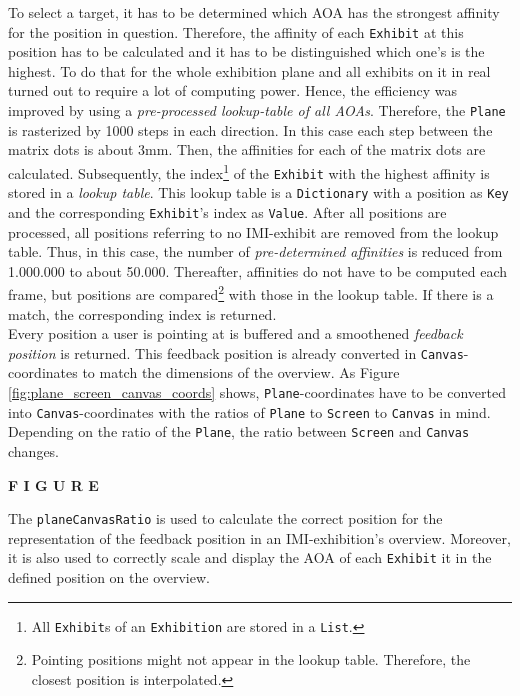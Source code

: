 To select a target, it has to be determined which \ac{AOA} has the strongest affinity for the position in question. Therefore, the affinity of each \texttt{Exhibit} at this position has to be calculated and it has to be distinguished which one's is the highest. To do that for the whole exhibition plane and all exhibits on it in real turned out to require a lot of computing power. Hence, the efficiency was improved by using a \textit{pre-processed lookup-table of all \ac{AOA}s}. Therefore, the \texttt{Plane} is rasterized by 1000 steps in each direction. In this case each step between the matrix dots is about 3mm. Then, the affinities for each of the matrix dots are calculated. Subsequently, the index\footnote{All \texttt{Exhibit}s of an \texttt{Exhibition} are stored in a \texttt{List}.} of the \texttt{Exhibit} with the highest affinity is stored in a \textit{lookup table}. This lookup table is a \texttt{Dictionary} with a position as \texttt{Key} and the corresponding \texttt{Exhibit}'s index as \texttt{Value}. After all positions are processed, all positions referring to no \ac{IMI}-exhibit are removed from the lookup table. Thus, in this case, the number of \textit{pre-determined affinities} is reduced from 1.000.000 to about 50.000. Thereafter, affinities do not have to be computed each frame, but positions are compared\footnote{Pointing positions might not appear in the lookup table. Therefore, the closest position is interpolated.} with those in the lookup table. If there is a match, the corresponding index is returned.
\\
Every position a user is pointing at is buffered and a smoothened \textit{feedback position} is returned. This feedback position is already converted in \texttt{Canvas}-coordinates to match the dimensions of the overview. As Figure \ref{fig:plane_screen_canvas_coords} shows, \texttt{Plane}-coordinates have to be converted into \texttt{Canvas}-coordinates with the ratios of \texttt{Plane} to \texttt{Screen} to \texttt{Canvas} in mind. Depending on the ratio of the \texttt{Plane}, the ratio between \texttt{Screen} and \texttt{Canvas} changes.

\textbf{F I G U R E}

The \texttt{planeCanvasRatio} is used to calculate the correct position for the representation of the feedback position in an \ac{IMI}-exhibition's overview. Moreover, it is also used to correctly scale and display the \ac{AOA} of each \texttt{Exhibit} it in the defined position on the overview.

